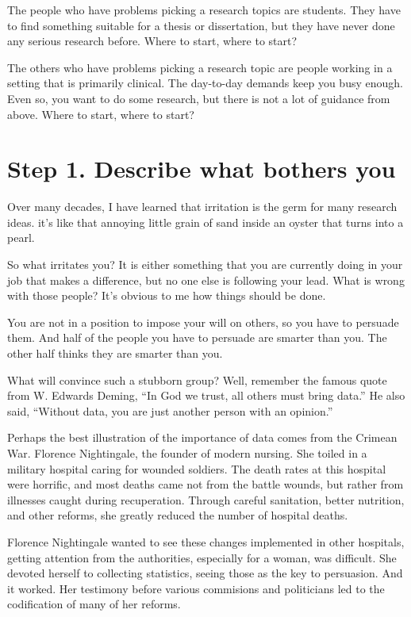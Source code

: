 \documentclass[
  letterpaper,
  DIV=11,
  numbers=noendperiod]{scrreprt}
\begin{document}
The people who have problems picking a research topics are students.
They have to find something suitable for a thesis or dissertation, but
they have never done any serious research before. Where to start, where
to start?

The others who have problems picking a research topic are people working
in a setting that is primarily clinical. The day-to-day demands keep you
busy enough. Even so, you want to do some research, but there is not a
lot of guidance from above. Where to start, where to start?

\section{Step 1. Describe what bothers
you}\label{step-1.-describe-what-bothers-you}

Over many decades, I have learned that irritation is the germ for many
research ideas. it's like that annoying little grain of sand inside an
oyster that turns into a pearl.

So what irritates you? It is either something that you are currently
doing in your job that makes a difference, but no one else is following
your lead. What is wrong with those people? It's obvious to me how
things should be done.

You are not in a position to impose your will on others, so you have to
persuade them. And half of the people you have to persuade are smarter
than you. The other half thinks they are smarter than you.

What will convince such a stubborn group? Well, remember the famous
quote from W. Edwards Deming, ``In God we trust, all others must bring
data.'' He also said, ``Without data, you are just another person with
an opinion.''

Perhaps the best illustration of the importance of data comes from the
Crimean War. Florence Nightingale, the founder of modern nursing. She
toiled in a military hospital caring for wounded soldiers. The death
rates at this hospital were horrific, and most deaths came not from the
battle wounds, but rather from illnesses caught during recuperation.
Through careful sanitation, better nutrition, and other reforms, she
greatly reduced the number of hospital deaths.

Florence Nightingale wanted to see these changes implemented in other
hospitals, getting attention from the authorities, especially for a
woman, was difficult. She devoted herself to collecting statistics,
seeing those as the key to persuasion. And it worked. Her testimony
before various commisions and politicians led to the codification of
many of her reforms.
\end{document}
